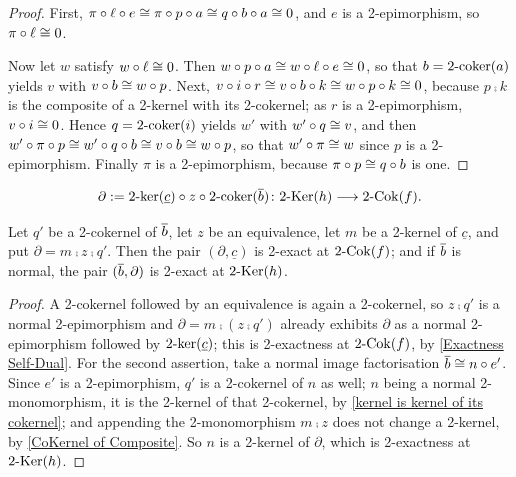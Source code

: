 \begin{proof}
  \leanok
  First, \(\pi\circ\ell\circ e\cong\pi\circ p\circ a\cong q\circ b\circ a\cong 0\), and \(e\) is a 2-epimorphism, so \(\pi\circ\ell\cong 0\).

	Now let \(w\) satisfy \(w\circ\ell\cong 0\). Then \(w\circ p\circ a\cong w\circ\ell\circ e\cong 0\), so that \(b=2\text{-}\mathrm{coker}(a)\) yields \(v\) with \(v\circ b\cong w\circ p\). Next, \(v\circ i\circ r\cong v\circ b\circ k\cong w\circ p\circ k\cong 0\), because \(p\comp k\) is the composite of a 2-kernel with its 2-cokernel; as \(r\) is a 2-epimorphism, \(v\circ i\cong 0\). Hence \(q=2\text{-}\mathrm{coker}(i)\) yields \(w'\) with \(w'\circ q\cong v\), and then \(w'\circ\pi\circ p\cong w'\circ q\circ b\cong v\circ b\cong w\circ p\), so that \(w'\circ\pi\cong w\) since \(p\) is a 2-epimorphism. Finally \(\pi\) is a 2-epimorphism, because \(\pi\circ p\cong q\circ b\) is one.
\end{proof}

\begin{equation}\label{Def Partial}
	\partial\mathrel{:=}2\text{-}\mathrm{ker}(\underline{c})\circ z\circ2\text{-}\mathrm{coker}(\overline{b})\colon2\text{-}\mathrm{Ker}(h)\longrightarrow2\text{-}\mathrm{Cok}(f)\text{.}
\end{equation}

\begin{proposition}
  \label{P:Shape}   \leanok
  Let \(q'\) be a 2-cokernel of \(\overline{b}\), let \(z\) be an equivalence, let \(m\) be a 2-kernel of \(\underline{c}\), and put \(\partial=m\comp z\comp q'\). Then the pair \((\partial,\underline{c})\) is 2-exact at \(2\text{-}\mathrm{Cok}(f)\); and if \(\overline{b}\) is normal, the pair \((\overline{b},\partial)\) is 2-exact at \(2\text{-}\mathrm{Ker}(h)\).
\end{proposition}

\begin{proof}
  \leanok
  A 2-cokernel followed by an equivalence is again a 2-cokernel, so \(z\comp q'\) is a normal 2-epimorphism and \(\partial=m\comp(z\comp q')\) already exhibits \(\partial\) as a normal 2-epimorphism followed by \(2\text{-}\mathrm{ker}(\underline{c})\); this is 2-exactness at \(2\text{-}\mathrm{Cok}(f)\), by \prox\ref{Exactness Self-Dual}. For the second assertion, take a normal image factorisation \(\overline{b}\cong n\circ e'\). Since \(e'\) is a 2-epimorphism, \(q'\) is a 2-cokernel of \(n\) as well; \(n\) being a normal 2-monomorphism, it is the 2-kernel of that 2-cokernel, by \prox\ref{kernel is kernel of its cokernel}; and appending the 2-monomorphism \(m\comp z\) does not change a 2-kernel, by \prox\ref{CoKernel of Composite}. So \(n\) is a 2-kernel of \(\partial\), which is 2-exactness at \(2\text{-}\mathrm{Ker}(h)\).
\end{proof}


